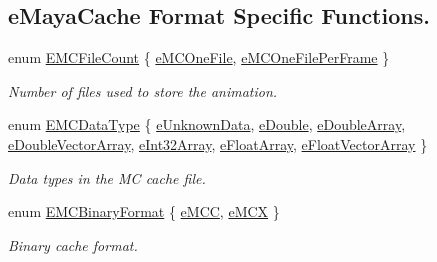 \subsection*{e\+Maya\+Cache Format Specific Functions.}
\begin{DoxyCompactItemize}
\item 
enum \hyperlink{class_fbx_cache_afa5d133385fbd74b59e619c692a9cc36}{E\+M\+C\+File\+Count} \{ \hyperlink{class_fbx_cache_afa5d133385fbd74b59e619c692a9cc36accc8c423e169fc778550575dcbd79bcc}{e\+M\+C\+One\+File}, 
\hyperlink{class_fbx_cache_afa5d133385fbd74b59e619c692a9cc36a443acbc8142a8e4fa3eeb2e4c3fea327}{e\+M\+C\+One\+File\+Per\+Frame}
 \}\begin{DoxyCompactList}\small\item\em Number of files used to store the animation. \end{DoxyCompactList}
\item 
enum \hyperlink{class_fbx_cache_a80f82fa5f485ff6c46565ffb151998b3}{E\+M\+C\+Data\+Type} \{ \newline
\hyperlink{class_fbx_cache_a80f82fa5f485ff6c46565ffb151998b3a8b26bb731da16a3dbab5e918598872b8}{e\+Unknown\+Data}, 
\hyperlink{class_fbx_cache_a80f82fa5f485ff6c46565ffb151998b3a09e5d7151cf86e037c15b41af0d65e9d}{e\+Double}, 
\hyperlink{class_fbx_cache_a80f82fa5f485ff6c46565ffb151998b3ae39b52564972de1cdcfde5ee56c5d4f2}{e\+Double\+Array}, 
\hyperlink{class_fbx_cache_a80f82fa5f485ff6c46565ffb151998b3a650d3bda5d6886776bee42118f711cb3}{e\+Double\+Vector\+Array}, 
\newline
\hyperlink{class_fbx_cache_a80f82fa5f485ff6c46565ffb151998b3a0d06622346b6fc69daf634a1233217c7}{e\+Int32\+Array}, 
\hyperlink{class_fbx_cache_a80f82fa5f485ff6c46565ffb151998b3ae331b4603d8eea0b4917d022530f7d07}{e\+Float\+Array}, 
\hyperlink{class_fbx_cache_a80f82fa5f485ff6c46565ffb151998b3a67596d008f526a50a8f0d888d3f5dd6a}{e\+Float\+Vector\+Array}
 \}\begin{DoxyCompactList}\small\item\em Data types in the MC cache file. \end{DoxyCompactList}
\item 
enum \hyperlink{class_fbx_cache_af3afea849dd371f0b5ecbe135d34b829}{E\+M\+C\+Binary\+Format} \{ \hyperlink{class_fbx_cache_af3afea849dd371f0b5ecbe135d34b829af019bf2bf0ab0788673f38da0364570c}{e\+M\+CC}, 
\hyperlink{class_fbx_cache_af3afea849dd371f0b5ecbe135d34b829a9f9f7cbd770451b48ea473902dd04568}{e\+M\+CX}
 \}\begin{DoxyCompactList}\small\item\em Binary cache format. \end{DoxyCompactList}

\end{DoxyCompactItemize}
